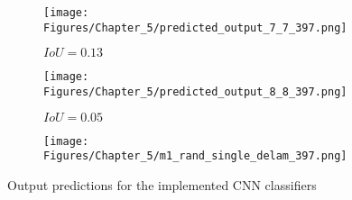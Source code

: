 \begin{figure} [h!]
	\par\medskip
	\begin{subfigure}[b]{0.32\textwidth}
		\centering
		\texttt{[image: Figures/Chapter\_5/predicted\_output\_7\_7\_397.png]}
		\caption{\(IoU=0.13\)}
		\label{fig:pred_7_7_case_397}
	\end{subfigure}
	\hfill
	\begin{subfigure}[b]{0.32\textwidth}
		\centering
		\texttt{[image: Figures/Chapter\_5/predicted\_output\_8\_8\_397.png]}
		\caption{\(IoU=0.05\)}
		\label{fig:pred_8_8_case_397}
	\end{subfigure}
	\hfill
	\begin{subfigure}[b]{0.32\textwidth}
		\centering
		\texttt{[image: Figures/Chapter\_5/m1\_rand\_single\_delam\_397.png]}
		\caption{}
		\label{fig:GT_case_397}
	\end{subfigure}
	\caption{Output predictions for the implemented CNN classifiers}
	\label{}
\end{figure} 
\clearpage
